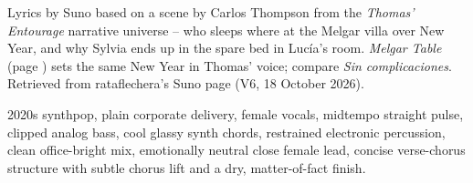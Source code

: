 
\label{sec:she-notices}
\begin{notes}
Lyrics by Suno based on a scene by Carlos Thompson from the \emph{Thomas' Entourage} narrative universe -- who sleeps where at the Melgar villa over New Year, and why Sylvia ends up in the spare bed in Lucía's room. \emph{Melgar Table} (page \pageref{sec:melgar-table}) sets the same New Year in Thomas' voice; compare \emph{Sin complicaciones}. Retrieved from rataflechera's Suno page (V6, 18 October 2026).
\end{notes}
\begin{style}
2020s synthpop, plain corporate delivery, female vocals, midtempo straight pulse, clipped analog bass, cool glassy synth chords, restrained electronic percussion, clean office-bright mix, emotionally neutral close female lead, concise verse-chorus structure with subtle chorus lift and a dry, matter-of-fact finish.
\end{style}

